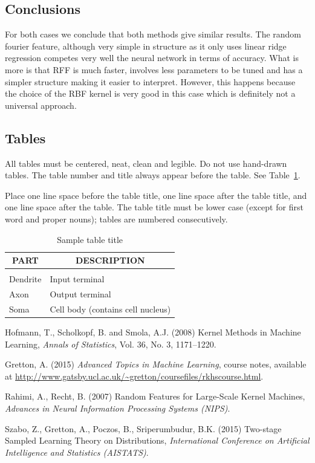 \documentclass{article} %
\begin{document}
\subsection{Conclusions}
For both cases we conclude that both methods give similar results. The random fourier feature, although very simple in structure as it only uses linear ridge regression competes very well the neural network in terms of accuracy. What is more is that RFF is much faster,  involves less parameters to be tuned and has a simpler structure making it easier to interpret. However, this happens because the choice of the RBF kernel is very good in this case which is definitely not a universal approach. 



\subsection{Tables}

All tables must be centered, neat, clean and legible. Do not use hand-drawn
tables. The table number and title always appear before the table. See
Table~\ref{sample-table}.

Place one line space before the table title, one line space after the table
title, and one line space after the table. The table title must be lower case
(except for first word and proper nouns); tables are numbered consecutively.

\begin{table}[t]
\caption{Sample table title}
\label{sample-table}
\begin{center}
\begin{tabular}{ll}
\multicolumn{1}{c}{\bf PART}  &\multicolumn{1}{c}{\bf DESCRIPTION}
\\ \hline \\
Dendrite         &Input terminal \\
Axon             &Output terminal \\
Soma             &Cell body (contains cell nucleus) \\
\end{tabular}
\end{center}
\end{table}

\begin{thebibliography}{20}
	Hofmann, T., Scholkopf, B. and Smola, A.J.
	(2008)
	Kernel Methods in Machine Learning,
	\textit{Annals of Statistics}, Vol. 36, No. 3, 1171–1220.
	
	
	Gretton, A.
	(2015)
	\textit{Advanced Topics in Machine Learning}, course notes, available at \url{http://www.gatsby.ucl.ac.uk/~gretton/coursefiles/rkhscourse.html}.
	
	Rahimi, A., Recht, B.
	(2007)
	Random Features for Large-Scale Kernel Machines,
	\textit{Advances in Neural Information Processing Systems (NIPS)}.
	
	Szabo, Z., Gretton, A., Poczos, B., Sriperumbudur, B.K.
	(2015)
	Two-stage Sampled Learning Theory on Distributions,
	\textit{International Conference on Artificial Intelligence and Statistics (AISTATS)}.
	
\end{thebibliography}
\end{document}
